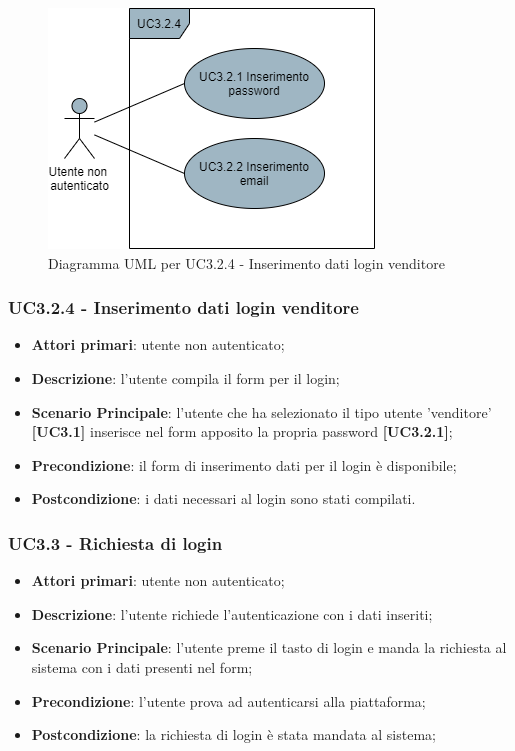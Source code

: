 \begin{figure}[H]
\centering
\includegraphics[scale=0.6]{res/UseCase/Immagini/InserimentoDatiLoginVenditore}
\caption{Diagramma UML per UC3.2.4 - Inserimento dati login venditore}
\end{figure}

\subsubsection{UC3.2.4 - Inserimento dati login venditore}
\begin{itemize}
\item \textbf{Attori primari}: utente non autenticato;
\item \textbf{Descrizione}: l'utente compila il form per il login;
\item \textbf{Scenario Principale}: l'utente che ha selezionato il tipo utente 'venditore' \textbf{[UC3.1]} inserisce nel form apposito la propria password \textbf{[UC3.2.1]};
\item \textbf{Precondizione}: il form di inserimento dati per il login è disponibile;
\item \textbf{Postcondizione}: i dati necessari al login sono stati compilati.
\end{itemize}

\subsubsection{UC3.3 - Richiesta di login}
\begin{itemize}
\item \textbf{Attori primari}: utente non autenticato;
\item \textbf{Descrizione}: l'utente richiede l'autenticazione con i dati inseriti;
\item \textbf{Scenario Principale}: l'utente preme il tasto di login e manda la richiesta al sistema con i dati presenti nel form;
\item \textbf{Precondizione}: l'utente prova ad autenticarsi alla piattaforma;
\item \textbf{Postcondizione}: la richiesta di login è stata mandata al sistema;
\end{itemize} 

